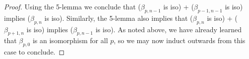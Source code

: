 \begin{proof}
  Using the 5-lemma we conclude that ($\beta_{p,n-1}$ is iso) + ($\beta_{p-1,n-1}$ is iso) implies ($\beta_{p,n}$ is iso). Similarly, the 5-lemma also implies that ($\beta_{p,n}$ is iso) + ($\beta_{p+1,n}$ is iso) implies ($\beta_{p,n-1}$ is iso). As noted above, we have already learned that $\beta_{p,0}$ is an isomorphism for all $p$, so we may now induct outwards from this case to conclude.
%
%
\end{proof}

